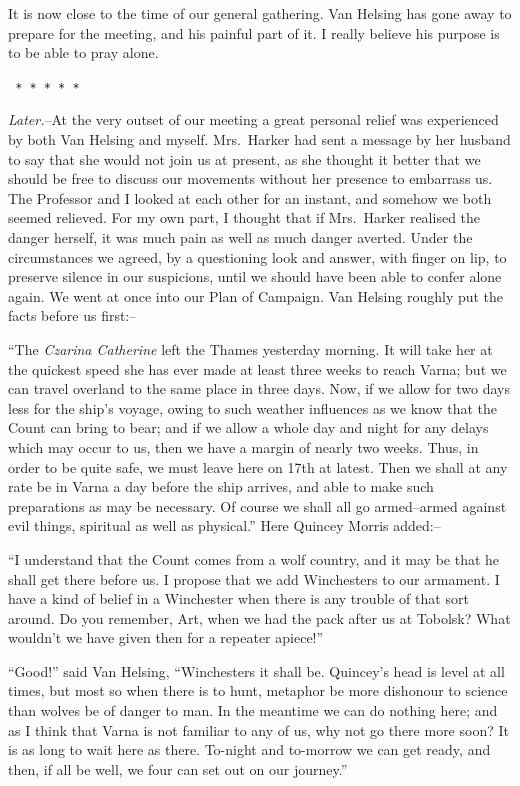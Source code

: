 \documentclass[12pt,openright]{book}
\begin{document}
It is now close to the time of our general gathering. Van Helsing has gone away to prepare for the meeting, and his painful part of it. I really believe his purpose is to be able to pray alone.

\texttt{   *       *       *       *       *}

\textit{Later.}–At the very outset of our meeting a great personal relief was experienced by both Van Helsing and myself. Mrs. Harker had sent a message by her husband to say that she would not join us at present, as she thought it better that we should be free to discuss our movements without her presence to embarrass us. The Professor and I looked at each other for an instant, and somehow we both seemed relieved. For my own part, I thought that if Mrs. Harker realised the danger herself, it was much pain as well as much danger averted. Under the circumstances we agreed, by a questioning look and answer, with finger on lip, to preserve silence in our suspicions, until we should have been able to confer alone again. We went at once into our Plan of Campaign. Van Helsing roughly put the facts before us first:–

“The \textit{Czarina Catherine} left the Thames yesterday morning. It will take her at the quickest speed she has ever made at least three weeks to reach Varna; but we can travel overland to the same place in three days. Now, if we allow for two days less for the ship’s voyage, owing to such weather influences as we know that the Count can bring to bear; and if we allow a whole day and night for any delays which may occur to us, then we have a margin of nearly two weeks. Thus, in order to be quite safe, we must leave here on 17th at latest. Then we shall at any rate be in Varna a day before the ship arrives, and able to make such preparations as may be necessary. Of course we shall all go armed–armed against evil things, spiritual as well as physical.” Here Quincey Morris added:–

“I understand that the Count comes from a wolf country, and it may be that he shall get there before us. I propose that we add Winchesters to our armament. I have a kind of belief in a Winchester when there is any trouble of that sort around. Do you remember, Art, when we had the pack after us at Tobolsk? What wouldn’t we have given then for a repeater apiece!”

“Good!” said Van Helsing, “Winchesters it shall be. Quincey’s head is level at all times, but most so when there is to hunt, metaphor be more dishonour to science than wolves be of danger to man. In the meantime we can do nothing here; and as I think that Varna is not familiar to any of us, why not go there more soon? It is as long to wait here as there. To-night and to-morrow we can get ready, and then, if all be well, we four can set out on our journey.”
\end{document}
